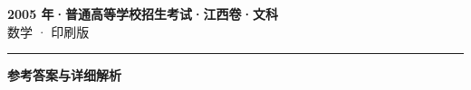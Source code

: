 \documentclass[zihao=5, a4paper]{ctexart}
\begin{document}
\begin{center}
  {\Large\bfseries 2005 年·普通高等学校招生考试·江西卷·文科}\\[4pt]
  {\large 数学 · 印刷版}
\end{center}
\medskip
{}

\par\bigskip\hrule\bigskip
{}
\begin{center}{\large\bfseries 参考答案与详细解析}\end{center}
\smallskip

\end{document}
